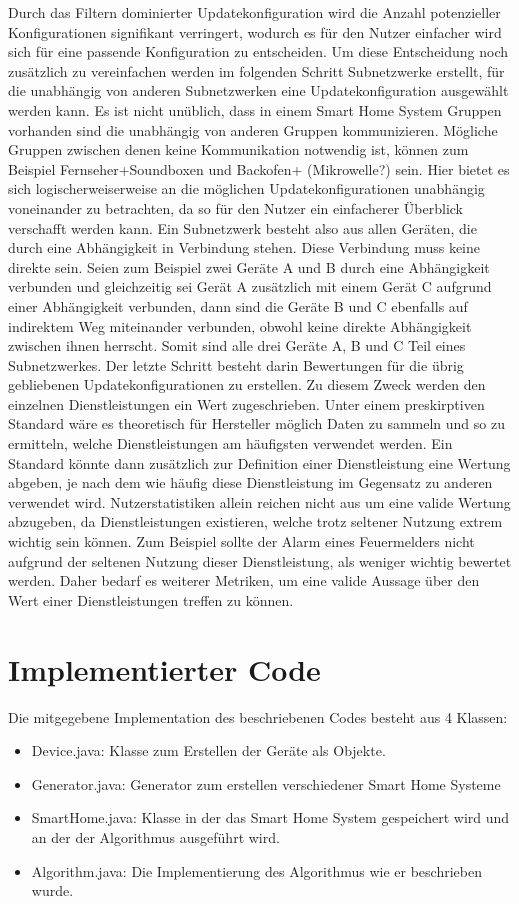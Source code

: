 Durch das Filtern dominierter Updatekonfiguration wird die Anzahl potenzieller Konfigurationen signifikant verringert, wodurch es für den Nutzer einfacher wird sich
für eine passende Konfiguration zu entscheiden. Um diese Entscheidung noch zusätzlich zu vereinfachen werden im folgenden Schritt Subnetzwerke erstellt, für die
unabhängig von anderen Subnetzwerken eine Updatekonfiguration ausgewählt werden kann. Es ist nicht unüblich, dass in einem Smart Home System Gruppen vorhanden
sind die unabhängig von anderen Gruppen kommunizieren. Mögliche Gruppen zwischen denen keine Kommunikation notwendig ist, können zum Beispiel Fernseher+Soundboxen
und Backofen+ (Mikrowelle?) sein. Hier bietet es sich logischerweiserweise an die möglichen Updatekonfigurationen unabhängig voneinander zu betrachten, da so für
den Nutzer ein einfacherer Überblick verschafft werden kann. 
Ein Subnetzwerk besteht also aus allen Geräten, die durch eine Abhängigkeit
in Verbindung stehen. Diese Verbindung muss keine direkte sein. Seien zum Beispiel zwei Geräte A und B durch eine Abhängigkeit verbunden und gleichzeitig sei Gerät
A zusätzlich mit einem Gerät C aufgrund einer Abhängigkeit verbunden, dann sind die Geräte B und C ebenfalls auf indirektem Weg miteinander verbunden, obwohl
keine direkte Abhängigkeit zwischen ihnen herrscht. Somit sind alle drei Geräte A, B und C Teil eines Subnetzwerkes.
Der letzte Schritt besteht darin Bewertungen für die übrig gebliebenen Updatekonfigurationen zu erstellen. Zu diesem Zweck werden den einzelnen Dienstleistungen ein
Wert zugeschrieben. Unter einem preskirptiven Standard wäre es theoretisch für Hersteller möglich Daten zu sammeln und so zu ermitteln, welche Dienstleistungen am 
häufigsten verwendet werden. Ein Standard könnte dann zusätzlich zur Definition einer Dienstleistung eine Wertung abgeben, je nach dem wie häufig diese Dienstleistung 
im Gegensatz zu anderen verwendet wird. Nutzerstatistiken allein reichen nicht aus um eine valide Wertung abzugeben, da Dienstleistungen existieren, welche trotz
seltener Nutzung extrem wichtig sein können. Zum Beispiel sollte der Alarm eines Feuermelders nicht aufgrund der seltenen Nutzung dieser Dienstleistung, als weniger wichtig
bewertet werden. Daher bedarf es weiterer Metriken, um eine valide Aussage über den Wert einer Dienstleistungen treffen zu können.

\section{Implementierter Code}
Die mitgegebene Implementation des beschriebenen Codes besteht aus 4 Klassen:
\begin{itemize}
\item Device.java: Klasse zum Erstellen der Geräte als Objekte.
\item Generator.java: Generator zum erstellen verschiedener Smart Home Systeme
\item SmartHome.java: Klasse in der das Smart Home System gespeichert wird und an der der Algorithmus ausgeführt wird.
\item Algorithm.java: Die Implementierung des Algorithmus wie er beschrieben wurde.
\end{itemize}

